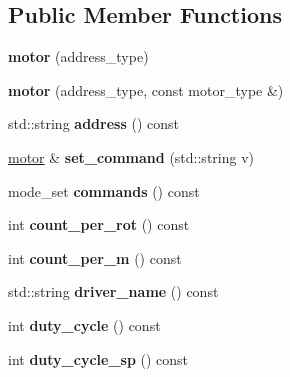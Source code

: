 \subsection*{Public Member Functions}
\begin{DoxyCompactItemize}
\item 
\mbox{\label{classev3dev_1_1motor_abfa67c960e2886fa4c7a6dc44be44d08}} 
{\bfseries motor} (address\+\_\+type)
\item 
\mbox{\label{classev3dev_1_1motor_a8f4b74b1ce474d6d3225970e89ad692d}} 
{\bfseries motor} (address\+\_\+type, const motor\+\_\+type \&)
\item 
\mbox{\label{classev3dev_1_1motor_aed36b27db79731f78cb9ffe01881efd0}} 
std\+::string {\bfseries address} () const
\item 
\mbox{\label{classev3dev_1_1motor_a181b0ffc6eda4770cd8d41f9a9cf8e63}} 
\hyperlink{classev3dev_1_1motor}{motor} \& {\bfseries set\+\_\+command} (std\+::string v)
\item 
\mbox{\label{classev3dev_1_1motor_a663cdc10c245eec0bd24bee5387543c1}} 
mode\+\_\+set {\bfseries commands} () const
\item 
\mbox{\label{classev3dev_1_1motor_a33b956606edc5fe39469802e36703b14}} 
int {\bfseries count\+\_\+per\+\_\+rot} () const
\item 
\mbox{\label{classev3dev_1_1motor_a9f9e90b79d5ff63fff2cce531f482e33}} 
int {\bfseries count\+\_\+per\+\_\+m} () const
\item 
\mbox{\label{classev3dev_1_1motor_af142e12b7dae20792917e689baee1f45}} 
std\+::string {\bfseries driver\+\_\+name} () const
\item 
\mbox{\label{classev3dev_1_1motor_a36cb40fbf061765d856a232ff4d1e59d}} 
int {\bfseries duty\+\_\+cycle} () const
\item 
\mbox{\label{classev3dev_1_1motor_aab7bceb552e311d7fb1c8d783b5e11a1}} 
int {\bfseries duty\+\_\+cycle\+\_\+sp} () const

\end{DoxyCompactItemize}
